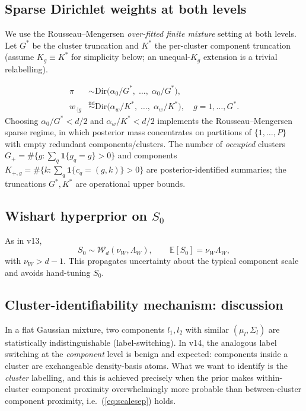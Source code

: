 \documentclass[11pt]{article}
\newcommand{\ind}{\mathbf{1}}
\newcommand{\Dir}{\mathrm{Dir}}
\begin{document}
\subsection{Sparse Dirichlet weights at both levels}
\label{sec:dirichlet}

We use the Rousseau--Mengersen \emph{over-fitted finite mixture} setting
at both levels. Let $G^*$ be the cluster truncation and $K^*$ the per-cluster
component truncation (assume $K_g\equiv K^*$ for simplicity below; an
unequal-$K_g$ extension is a trivial relabelling).

\begin{align}
\pi          &\sim \Dir\!\bigl(\alpha_0/G^*,\;\ldots,\;\alpha_0/G^*\bigr), \label{eq:pi-prior}\\
w_{\cdot|g}  &\stackrel{\mathrm{iid}}{\sim} \Dir\!\bigl(\alpha_w/K^*,\;\ldots,\;\alpha_w/K^*\bigr),
\quad g=1,\ldots,G^*. \label{eq:w-prior}
\end{align}
Choosing $\alpha_0/G^* < d/2$ and $\alpha_w/K^* < d/2$ implements the
Rousseau--Mengersen sparse regime, in which posterior mass concentrates
on partitions of $\{1,\ldots,P\}$ with empty redundant components/clusters.
The number of \emph{occupied} clusters $G_+ = \#\{g:\sum_q \ind\{g_q=g\}>0\}$
and components $K_{+,g}=\#\{k:\sum_q \ind\{c_q=(g,k)\}>0\}$ are
posterior-identified summaries; the truncations $G^*,K^*$ are operational
upper bounds.

\subsection{Wishart hyperprior on $S_0$}
\label{sec:wishart-prior}

As in v13,
\begin{equation}
S_0 \sim \mathcal{W}_d(\nu_W,\Lambda_W),
\qquad \mathbb{E}[S_0]=\nu_W\Lambda_W,
\label{eq:wishprior}
\end{equation}
with $\nu_W>d-1$. This propagates uncertainty about the typical
component scale and avoids hand-tuning $S_0$.

\subsection{Cluster-identifiability mechanism: discussion}
\label{sec:cidisc}

In a flat Gaussian mixture, two components $l_1,l_2$ with similar
$(\mu_l,\Sigma_l)$ are statistically indistinguishable (label-switching).
In v14, the analogous label switching at the \emph{component} level is
benign and expected: components inside a cluster are exchangeable
density-basis atoms. What we want to identify is the \emph{cluster}
labelling, and this is achieved precisely when the prior makes within-cluster
component proximity overwhelmingly more probable than between-cluster
component proximity, i.e.\ (\ref{eq:scalesep}) holds.
\end{document}
